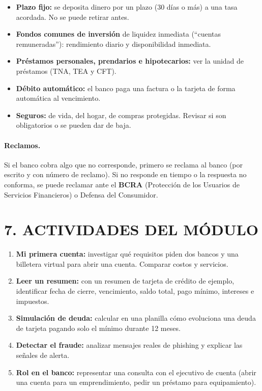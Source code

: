 \begin{itemize}
  \item \textbf{Plazo fijo:} se deposita dinero por un plazo (30 días o más) a una tasa
        acordada. No se puede retirar antes.
  \item \textbf{Fondos comunes de inversión} de liquidez inmediata (``cuentas remuneradas''):
        rendimiento diario y disponibilidad inmediata.
  \item \textbf{Préstamos personales, prendarios e hipotecarios:} ver la unidad de préstamos
        (TNA, TEA y CFT).
  \item \textbf{Débito automático:} el banco paga una factura o la tarjeta de forma automática
        al vencimiento.
  \item \textbf{Seguros:} de vida, del hogar, de compras protegidas. Revisar si son
        obligatorios o se pueden dar de baja.
\end{itemize}

\paragraph*{Reclamos.}
Si el banco cobra algo que no corresponde, primero se reclama al banco (por escrito y con número
de reclamo). Si no responde en tiempo o la respuesta no conforma, se puede reclamar ante el
\textbf{BCRA} (Protección de los Usuarios de Servicios Financieros) o Defensa del Consumidor.

\section*{7. ACTIVIDADES DEL MÓDULO}

\begin{enumerate}
  \item \textbf{Mi primera cuenta:} investigar qué requisitos piden dos bancos y una billetera
        virtual para abrir una cuenta. Comparar costos y servicios.
  \item \textbf{Leer un resumen:} con un resumen de tarjeta de crédito de ejemplo, identificar
        fecha de cierre, vencimiento, saldo total, pago mínimo, intereses e impuestos.
  \item \textbf{Simulación de deuda:} calcular en una planilla cómo evoluciona una deuda de
        tarjeta pagando solo el mínimo durante 12 meses.
  \item \textbf{Detectar el fraude:} analizar mensajes reales de phishing y explicar las señales
        de alerta.
  \item \textbf{Rol en el banco:} representar una consulta con el ejecutivo de cuenta (abrir una
        cuenta para un emprendimiento, pedir un préstamo para equipamiento).
\end{enumerate}
